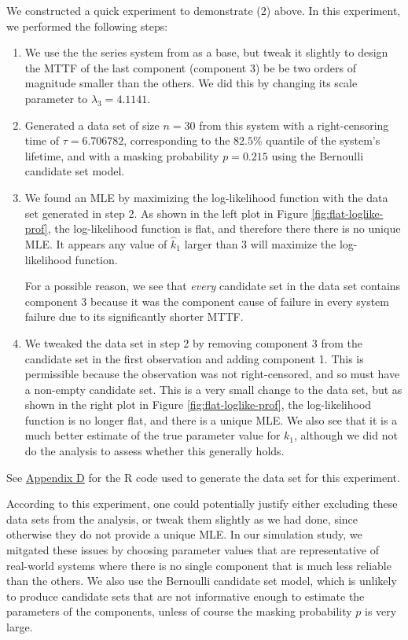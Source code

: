 \documentclass[
]{article}
\begin{document}
We constructed a quick experiment to demonstrate (2) above. In this
experiment, we performed the following steps:

\begin{enumerate}
\def\labelenumi{\arabic{enumi}.}
\item
  We use the the series system from \citep{Huairu-2013} as a base, but
  tweak it slightly to design the MTTF of the last component (component
  3) be be two orders of magnitude smaller than the others. We did this
  by changing its scale parameter to \(\lambda_3 = 4.1141\).
\item
  Generated a data set of size \(n = 30\) from this system with a
  right-censoring time of \(\tau = 6.706782\), corresponding to the
  \(82.5\%\) quantile of the system's lifetime, and with a masking
  probability \(p = 0.215\) using the Bernoulli candidate set model.
\item
  We found an MLE by maximizing the log-likelihood function with the
  data set generated in step 2. As shown in the left plot in Figure
  \ref{fig:flat-loglike-prof}, the log-likelihood function is flat, and
  therefore there there is no unique MLE. It appears any value of
  \(\hat k_1\) larger than \(3\) will maximize the log-likelihood
  function.

  For a possible reason, we see that \emph{every} candidate set in the
  data set contains component 3 because it was the component cause of
  failure in every system failure due to its significantly shorter MTTF.
\item
  We tweaked the data set in step 2 by removing component 3 from the
  candidate set in the first observation and adding component 1. This is
  permissible because the observation was not right-censored, and so
  must have a non-empty candidate set. This is a very small change to
  the data set, but as shown in the right plot in Figure
  \ref{fig:flat-loglike-prof}, the log-likelihood function is no longer
  flat, and there is a unique MLE. We also see that it is a much better
  estimate of the true parameter value for \(k_1\), although we did not
  do the analysis to assess whether this generally holds.
\end{enumerate}

See \hyperref[app:flat-like-code]{Appendix D} for the R code used to
generate the data set for this experiment.

According to this experiment, one could potentially justify either
excluding these data sets from the analysis, or tweak them slightly as
we had done, since otherwise they do not provide a unique MLE. In our
simulation study, we mitgated these issues by choosing parameter values
that are representative of real-world systems where there is no single
component that is much less reliable than the others. We also use the
Bernoulli candidate set model, which is unlikely to produce candidate
sets that are not informative enough to estimate the parameters of the
components, unless of course the masking probability \(p\) is very
large.
\end{document}

